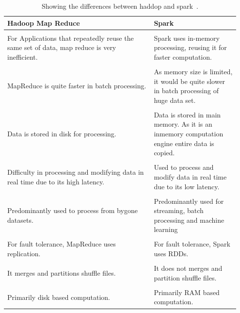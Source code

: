\documentclass[]{final_report}
\begin{document}
\begin{table}[ht!]
    \begin{center}
    \label{tab:Amino acids}
        \begin{tabular}{p{0.6\linewidth}|p{0.35\linewidth}}
        Hadoop Map Reduce & Spark\\
        \hline
        \\
        For Applications that repeatedly reuse the same set of data, map reduce is very inefficient. & Spark uses in-memory processing, reusing it for faster computation.
        \\
        \hline
        \\
        MapReduce is quite faster in batch processing. & As memory size is limited, it would be quite slower in batch processing of huge data set.
        \\
        \hline
        \\
        Data is stored in disk for processing. & Data is stored in main memory. As it is an inmemory computation engine entire data is copied. 
        \\
        \hline
        \\
        Difficulty in processing and modifying data in real time due to its high latency. & Used to process and modify data in real time due to its low latency. 
        \\
        \hline
        \\
        Predominantly used to process from bygone datasets. & Predominantly used for streaming, batch processing and machine learning
        \\
        \hline
        \\
        For fault tolerance, MapReduce uses replication. & For fault tolerance, Spark uses RDDs.
        \\
        \hline
        \\
        It merges and partitions shuffle files. & It does not merges and partition shuffle files. 
        \\
        \hline
        \\
        Primarily disk based computation. & Primarily RAM based computation.
        \\
        \end{tabular}
        \caption{\label{hadoopvsspark}Showing the differences between haddop and spark~\cite{hazarika_performance_2017}.}
    \end{center}
\end{table}
\end{document}
